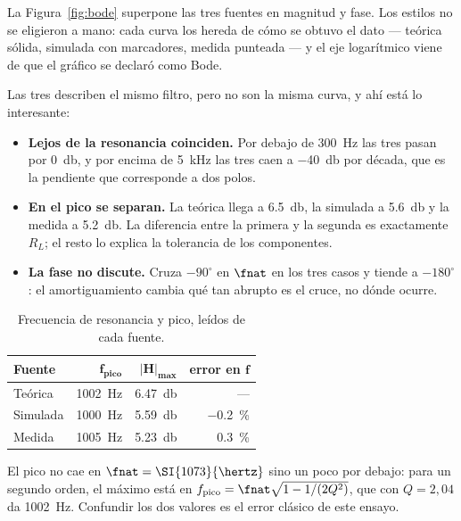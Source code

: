 La Figura~\ref{fig:bode} superpone las tres fuentes en magnitud y fase. Los
estilos no se eligieron a mano: cada curva los hereda de cómo se obtuvo el dato
--- teórica sólida, simulada con marcadores, medida punteada --- y el eje
logarítmico viene de que el gráfico se declaró como Bode.

Las tres describen el mismo filtro, pero no son la misma curva, y ahí está lo
interesante:

\begin{itemize}[itemsep=2pt, topsep=4pt]
  \item \textbf{Lejos de la resonancia coinciden.} Por debajo de
        \SI{300}{\hertz} las tres pasan por \SI{0}{\decibel}, y por encima de
        \SI{5}{\kilo\hertz} las tres caen a \SI{-40}{\decibel} por década, que
        es la pendiente que corresponde a dos polos.
  \item \textbf{En el pico se separan.} La teórica llega a
        \SI{6.5}{\decibel}, la simulada a \SI{5.6}{\decibel} y la medida a
        \SI{5.2}{\decibel}. La diferencia entre la primera y la segunda es
        exactamente $R_L$; el resto lo explica la tolerancia de los componentes.
  \item \textbf{La fase no discute.} Cruza $-90^\circ$ en $\fnat$ en los tres
        casos y tiende a $-180^\circ$: el amortiguamiento cambia qué tan abrupto
        es el cruce, no dónde ocurre.
\end{itemize}

\begin{table}[H]
\centering
\caption{Frecuencia de resonancia y pico, leídos de cada fuente.}
\label{tab:resultados}
\small
\begin{tabular}{lrrr}
\toprule
\textbf{Fuente} & $\bm{f_{\text{pico}}}$ & $\bm{|H|_{\max}}$ & \textbf{error en $\bm{f}$} \\
\midrule
Teórica  & \SI{1002}{\hertz} & \SI{6.47}{\decibel} & --- \\
Simulada & \SI{1000}{\hertz} & \SI{5.59}{\decibel} & \SI{-0.2}{\percent} \\
Medida   & \SI{1005}{\hertz} & \SI{5.23}{\decibel} & \SI{+0.3}{\percent} \\
\bottomrule
\end{tabular}
\end{table}

\noindent
El pico no cae en $\fnat = \SI{1073}{\hertz}$ sino un poco por debajo: para un
segundo orden, el máximo está en
$f_{\text{pico}} = \fnat\sqrt{1 - 1/(2Q^{2})}$, que con $Q = 2{,}04$ da
\SI{1002}{\hertz}. Confundir los dos valores es el error clásico de este ensayo.
